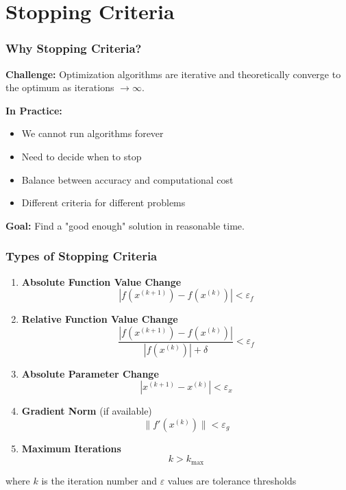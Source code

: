 \documentclass{beamer}
\begin{document}




\section{Stopping Criteria}

\begin{frame}
\frametitle{Why Stopping Criteria?}
\textbf{Challenge:} Optimization algorithms are iterative and theoretically converge to the optimum as iterations $\to \infty$.

\vspace{0.5cm}

\textbf{In Practice:}
\begin{itemize}
    \item We cannot run algorithms forever
    \item Need to decide when to stop
    \item Balance between accuracy and computational cost
    \item Different criteria for different problems
\end{itemize}

\vspace{0.5cm}

\textbf{Goal:} Find a "good enough" solution in reasonable time.
\end{frame}

\begin{frame}
\frametitle{Types of Stopping Criteria}
\begin{enumerate}
    \item \textbf{Absolute Function Value Change}
    $$|f(x^{(k+1)}) - f(x^{(k)})| < \varepsilon_f$$
    
    \item \textbf{Relative Function Value Change}
    $$\frac{|f(x^{(k+1)}) - f(x^{(k)})|}{|f(x^{(k)})| + \delta} < \varepsilon_f$$
    
    \item \textbf{Absolute Parameter Change}
    $$|x^{(k+1)} - x^{(k)}| < \varepsilon_x$$
    
    \item \textbf{Gradient Norm} (if available)
    $$\|f'(x^{(k)})\| < \varepsilon_g$$
    
    \item \textbf{Maximum Iterations}
    $$k > k_{\max}$$
\end{enumerate}

\small{where $k$ is the iteration number and $\varepsilon$ values are tolerance thresholds}
\end{frame}
\end{document}
